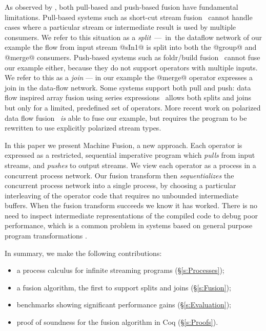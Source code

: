 As observed by \citet{kay2009you}, both pull-based and push-based fusion have fundamental limitations. Pull-based systems such as short-cut stream fusion~\cite{coutts2007stream} cannot handle cases where a particular stream or intermediate result is used by multiple consumers. We refer to this situation as a \mbox{\emph{split} --- in the} dataflow network of our example the flow from input stream @sIn1@ is split into both the @group@ and @merge@ consumers. Push-based systems such as foldr/build fusion~\cite{gill1993short} cannot fuse our example either, because they do not support operators with multiple inputs. We refer to this as a \emph{join} --- in our example the @merge@ operator expresses a join in the data-flow network. Some systems support both pull and push: data flow inspired array fusion using series expressions~\cite{lippmeier2013data} allows both splits and joins but only for a limited, predefined set of operators. More recent work on polarized data flow fusion~\cite{lippmeier2016polarized} \emph{is} able to fuse our example, but requires the program to be rewritten to use explicitly polarized stream types. 

In this paper we present Machine Fusion, a new approach. Each operator is expressed as a restricted, sequential imperative program which \emph{pulls} from input streams, and \emph{pushes} to output streams. We view each operator as a process in a concurrent process network. Our fusion transform then \emph{sequentializes} the concurrent process network into a single process, by choosing a particular interleaving of the operator code that requires no unbounded intermediate buffers. When the fusion transform succeeds we know it has worked. There is no need to inspect intermediate representations of the compiled code to debug poor performance, which is a common problem in systems based on general purpose program transformations \cite{lippmeier2012:guiding}.

In summary, we make the following contributions:
\begin{itemize}
\item a process calculus for infinite streaming programs (\S\ref{s:Processes});
\item a fusion algorithm, the first to support splits and joins (\S\ref{s:Fusion});
\item benchmarks showing significant performance gains (\S\ref{s:Evaluation});
\item proof of soundness for the fusion algorithm in Coq (\S\ref{s:Proofs}).
\end{itemize}

